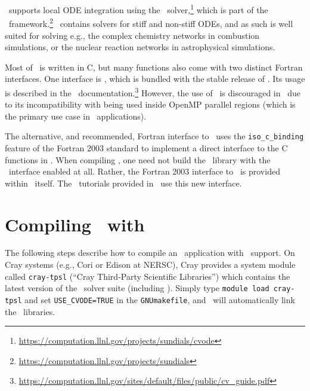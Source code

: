 \amrex\ supports local ODE integration using the \cvode\ solver,\footnote{\url{https://computation.llnl.gov/projects/sundials/cvode}} which is part of the \sundials\ framework.\footnote{\url{https://computation.llnl.gov/projects/sundials}}
\cvode\ contains solvers for stiff and non-stiff ODEs, and as such is well suited for solving e.g., the complex chemistry networks in combustion simulations, or the nuclear reaction networks in astrophysical simulations.

Most of \cvode\ is written in C, but many functions also come with two distinct Fortran interfaces.
One interface is \fcvode, which is bundled with the stable release of \cvode.
Its usage is described in the \cvode\ documentation.\footnote{\url{https://computation.llnl.gov/sites/default/files/public/cv_guide.pdf}}
However, the use of \fcvode\ is discouraged in \amrex\ due to its incompatibility with being used inside OpenMP parallel regions (which is the primary use case in \amrex\ applications).

The alternative, and recommended, Fortran interface to \cvode\ uses the \texttt{iso\_c\_binding} feature of the Fortran 2003 standard to implement a direct interface to the C functions in \cvode.
When compiling \cvode, one need not build the \cvode\ library with the \fcvode\ interface enabled at all.
Rather, the Fortran 2003 interface to \cvode\ is provided within \amrex\ itself.
The \cvode\ tutorials provided in \amrex\ use this new interface.

\section{Compiling \amrex\ with \cvode}

The following steps describe how to compile an \amrex\ application with \cvode\ support.
On Cray systems (e.g., Cori or Edison at NERSC), Cray provides a system module called \texttt{cray-tpsl} (``Cray Third-Party Scientific Libraries'') which contains the latest version of the \sundials\ solver suite (including \cvode).
Simply type \texttt{module load cray-tpsl} and set \texttt{USE\_CVODE=TRUE} in the \texttt{GNUmakefile}, and \amrex\ will automatically link the \sundials\ libraries.

